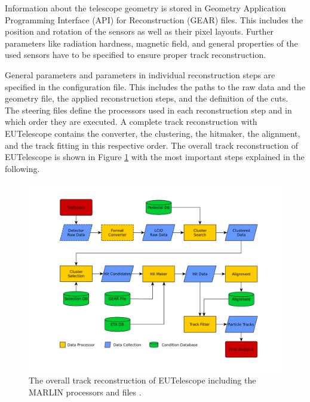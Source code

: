 Information about the telescope geometry is stored in Geometry  Application Programming Interface (API) for Reconstruction (GEAR) files. This includes the position and rotation
of the sensors as well as their pixel layouts. Further parameters like radiation hardness, magnetic field, and general properties of the used sensors have to be
specified to ensure proper track reconstruction.

General parameters and parameters in individual reconstruction steps are specified in the configuration file. This includes the paths to the raw data and the
geometry file, the applied reconstruction steps, and the definition of the cuts. \\
The steering files define the processors used in each reconstruction step and in which order they are executed.
A complete track reconstruction with EUTelescope contains the converter, the clustering, the hitmaker, the alignment, and the track fitting in this respective order.
The overall track reconstruction of EUTelescope is shown in Figure \ref{fig:track_reco} with the most important steps explained in the following.

\begin{figure}[H]
  \hspace{-1.3cm}
  \includegraphics[height=0.85\textwidth]{images/track_reco.png}
  \caption{The overall track reconstruction of EUTelescope including the MARLIN processors and files \cite{track_reco}.}
  \label{fig:track_reco}
\end{figure}

